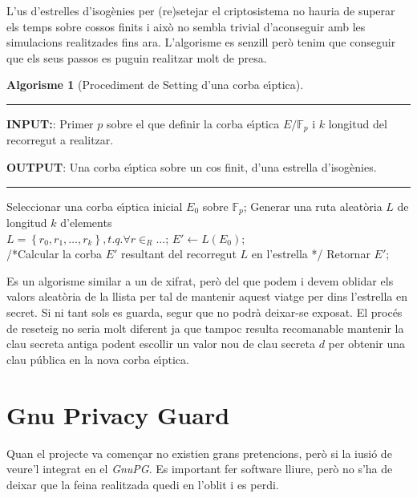 \documentclass[12pt,twoside,catalan,a4paper]{book}%
\numberwithin{figure}{section}		%
\theoremstyle{definition}   			%
\def\ce{corba e\lgem{}\'{\i}ptica}%
\def\cf{cos finit}%
\def\cfs{cossos finits}%
\newcommand{\Fp}{\ensuremath{\mathbb{F}_p}}%
\newcommand{\EFpbis}{\ensuremath{E/\mathbb{F}_p}}
\theoremstyle{saltolinea}   			%
\newtheorem{algo}{Algorisme}
\begin{document}
L'us d'estrelles d'isog\`enies per (re)setejar el criptosistema no hauria de superar els temps sobre \cfs{} i aix\`o no sembla trivial d'aconseguir amb les simulacions realitzades fins ara. L'algorisme es senzill per\`o tenim que conseguir que els seus passos es puguin realitzar molt de presa.

\begin{table}[H]
\begin{algo}[Procediment de Setting d'una \ce{}]\label{alg:isogenia}
 \parbox[b]{\linewidth}{%
\hrule
\smallskip
{\bf INPUT:}: Primer $p$ sobre el que definir la \ce{} \EFpbis{} i $k$ longitud del recorregut a realitzar.

{\bf OUTPUT}: Una \ce{} sobre un \cf{}, d'una estrella d'isog\`enies.
\vspace{1.5mm}
\hrule
}%
\begin{algorithmic}[1]
\STATE Seleccionar una \ce{} inicial $E_{0}$ sobre \Fp;
\STATE Generar una ruta aleat\`oria $L$ de longitud $k$ d'elements \\ $L=\left\{r_{0},r_{1},\dots,r_{k}\right\},t.q. \forall r\in_{R}...$;%
\STATE $E' \leftarrow L\left(E_{0}\right)$; \\ /*Calcular la corba $E'$ resultant del recorregut $L$ en l'estrella  */
\STATE Retornar $E'$;
\end{algorithmic}
\end{algo}
\end{table}

Es un algorisme similar a un de xifrat, per\`o del que podem i devem oblidar els valors aleat\`oria de la llista per tal de mantenir aquest viatge per dins l'estrella en secret. Si ni tant sols es guarda, segur que no podr\`a deixar-se exposat. El proc\'es de reseteig no seria molt diferent ja que tampoc resulta recomanable mantenir la clau secreta antiga podent escollir un valor nou de clau secreta $d$ per obtenir una clau p\'ublica en la nova \ce{}.

\chapter{Gnu Privacy Guard}\label{ch:GnuPG}

Quan el projecte \cite{BM04} va comen\c{c}ar no existien grans pretencions, per\`o si la i\lgem{}usi\'o de veure'l integrat en el \emph{GnuPG}. Es important fer software lliure, per\`o no s'ha de deixar que la feina realitzada quedi en l'oblit i es perdi.
\end{document}

